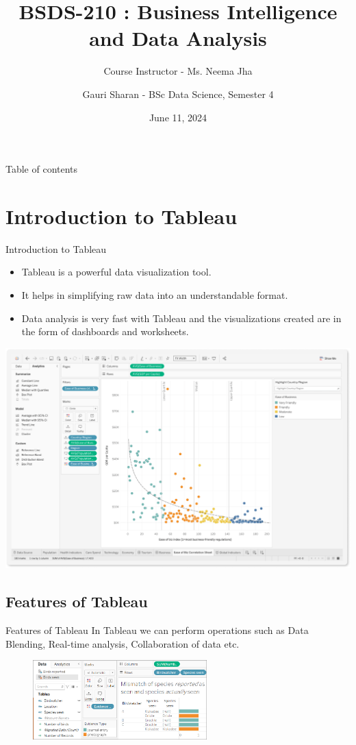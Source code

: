 \documentclass[aspectratio=169, hideothersubsections]{beamer}
\title{BSDS-210 : Business Intelligence and Data Analysis}
\subtitle{Course Instructor - Ms. Neema Jha}
\author[Gauri Sharan]{Gauri Sharan - BSc Data Science, Semester 4}
\date{June 11, 2024}
\begin{document}
\frame{\titlepage}

\begin{frame}{Table of contents}
    \tableofcontents[hideallsubsections]
\end{frame}

\section{Introduction to Tableau}
\begin{frame}{Introduction to Tableau}
  \begin{itemize}
    \item Tableau is a powerful data visualization tool.
    \item It helps in simplifying raw data into an understandable format.
    \item Data analysis is very fast with Tableau and the visualizations created are in the form of dashboards and worksheets.
  \end{itemize}
  \includegraphics[width=\textwidth]{tab1.png}
\end{frame}

\subsection{Features of Tableau}
\begin{frame}{Features of Tableau}
In Tableau we can perform operations such as Data Blending, Real-time analysis, Collaboration of data etc.
\begin{figure}
  \centering
  \includegraphics[width=0.6\textwidth]{tab2.png}
  \label{fig:example}
\end{figure}
\end{frame}
\end{document}
